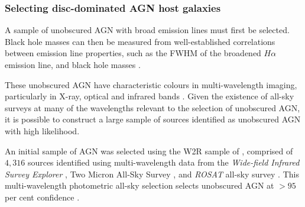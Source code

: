 \subsubsection{Selecting disc-dominated AGN host galaxies}\label{sec:selectAGN}%

A sample of unobscured AGN with broad emission lines must first be selected. Black hole masses can then be measured from well-established correlations between emission line properties, such as the FWHM of the broadened $H\alpha$ emission line, and black hole masses \citep[e.g.,][]{gh07a, jiang11a,xiao11, peterson14}. 

These unobscured AGN have characteristic colours in multi-wavelength imaging, particularly in X-ray, optical and infrared bands \citep{kauffmann03b, dstern05, goulding09, kauffmann09, aird12, mendez13, azadi16, cowley16, harrison16}. Given the existence of all-sky surveys at many of the wavelengths relevant to the selection of unobscured AGN, it is possible to construct a large sample of sources identified as unobscured AGN with high likelihood.

An initial sample of AGN was selected using the W2R sample of \citet{edelson12}, comprised of $4,316$ sources identified using multi-wavelength data from the \emph{Wide-field Infrared Survey Explorer} \citep[\emph{WISE};][]{wright10}, Two Micron All-Sky Survey \citep[2MASS;][]{skrutskie06}, and \emph{ROSAT} all-sky survey \citep[RASS;][]{voges99}. This multi-wavelength photometric all-sky selection selects unobscured AGN at $>95$ per cent confidence \citep{edelson12}.


